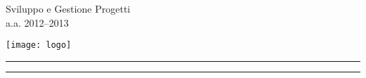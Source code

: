 \pagestyle{empty}
\begin{center}

{\sffamily
Sviluppo e Gestione Progetti\\
a.a. 2012--2013
}

\vskip 1.5cm

\texttt{[image: logo]}

\medskip
{\Huge\sffamily\bfseries
\team
}

\vskip 1.5cm

{\Large\sffamily\bfseries
\caName
}

\vskip 1cm

\hrule
\vskip 10pt
{\Huge\scshape
\doctitle
}
\vskip 10pt
\hrule

\end{center}

\clearpage